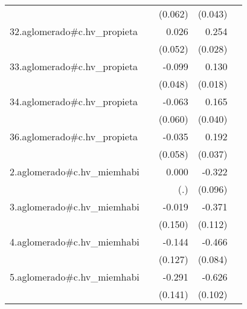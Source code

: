 {\begin{longtable}{l*{4}{D{.}{.}{-1}}}
            &                     &     (0.062)         &     (0.043)         &                     \\
\addlinespace
32.aglomerado#c.hv\_propieta&                     &       0.026         &       0.254\sym{***}&                     \\
            &                     &     (0.052)         &     (0.028)         &                     \\
\addlinespace
33.aglomerado#c.hv\_propieta&                     &      -0.099\sym{*}  &       0.130\sym{***}&                     \\
            &                     &     (0.048)         &     (0.018)         &                     \\
\addlinespace
34.aglomerado#c.hv\_propieta&                     &      -0.063         &       0.165\sym{***}&                     \\
            &                     &     (0.060)         &     (0.040)         &                     \\
\addlinespace
36.aglomerado#c.hv\_propieta&                     &      -0.035         &       0.192\sym{***}&                     \\
            &                     &     (0.058)         &     (0.037)         &                     \\
\addlinespace
2.aglomerado#c.hv\_miemhabi&                     &       0.000         &      -0.322\sym{***}&                     \\
            &                     &         (.)         &     (0.096)         &                     \\
\addlinespace
3.aglomerado#c.hv\_miemhabi&                     &      -0.019         &      -0.371\sym{***}&                     \\
            &                     &     (0.150)         &     (0.112)         &                     \\
\addlinespace
4.aglomerado#c.hv\_miemhabi&                     &      -0.144         &      -0.466\sym{***}&                     \\
            &                     &     (0.127)         &     (0.084)         &                     \\
\addlinespace
5.aglomerado#c.hv\_miemhabi&                     &      -0.291\sym{*}  &      -0.626\sym{***}&                     \\
            &                     &     (0.141)         &     (0.102)         &                     \\

\end{longtable}}
